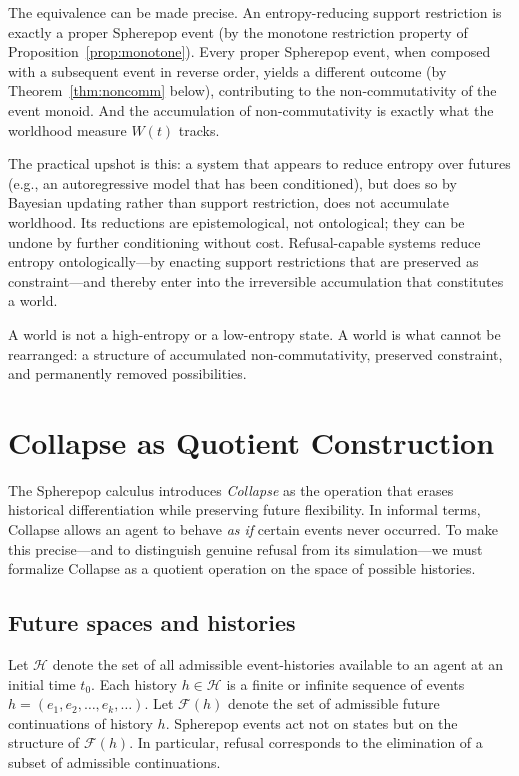 \documentclass[11pt]{article}
\begin{document}
The equivalence can be made precise. An entropy-reducing support restriction is
exactly a proper Spherepop event (by the monotone restriction property of
Proposition~\ref{prop:monotone}). Every proper Spherepop event, when composed
with a subsequent event in reverse order, yields a different outcome (by
Theorem~\ref{thm:noncomm} below), contributing to the non-commutativity of the
event monoid. And the accumulation of non-commutativity is exactly what the
worldhood measure $W(t)$ tracks.

The practical upshot is this: a system that appears to reduce entropy over
futures (e.g., an autoregressive model that has been conditioned), but does so
by Bayesian updating rather than support restriction, does not accumulate
worldhood. Its reductions are epistemological, not ontological; they can be
undone by further conditioning without cost. Refusal-capable systems reduce
entropy ontologically---by enacting support restrictions that are preserved as
constraint---and thereby enter into the irreversible accumulation that constitutes
a world.

A world is not a high-entropy or a low-entropy state. A world is what cannot be
rearranged: a structure of accumulated non-commutativity, preserved constraint,
and permanently removed possibilities.

\section{Collapse as Quotient Construction}

The Spherepop calculus introduces \emph{Collapse} as the operation that erases
historical differentiation while preserving future flexibility. In informal
terms, Collapse allows an agent to behave \emph{as if} certain events never
occurred. To make this precise---and to distinguish genuine refusal from its
simulation---we must formalize Collapse as a quotient operation on the space of
possible histories.

\subsection{Future spaces and histories}

Let $\mathcal{H}$ denote the set of all admissible event-histories available to
an agent at an initial time $t_0$. Each history $h \in \mathcal{H}$ is a finite
or infinite sequence of events $h = (e_1, e_2, \dots, e_k, \dots)$. Let
$\mathcal{F}(h)$ denote the set of admissible future continuations of history
$h$. Spherepop events act not on states but on the structure of
$\mathcal{F}(h)$. In particular, refusal corresponds to the elimination of a
subset of admissible continuations.
\end{document}
